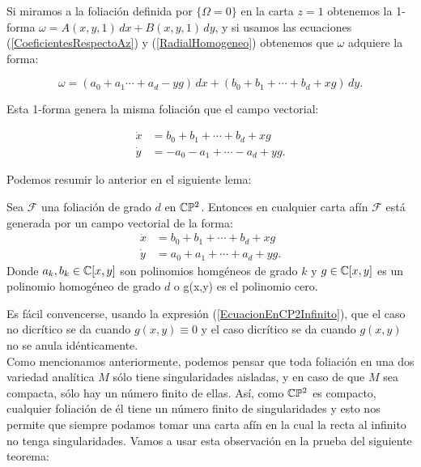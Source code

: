 Si miramos a la foliación definida por $\{ \Omega=0 \}$ en la carta $z=1$ obtenemos la 1-forma $\omega=A(x,y,1)\, dx+B(x,y,1)\, dy$, y si usamos las ecuaciones (\ref{CoeficientesRespectoAz}) y (\ref{RadialHomogeneo}) obtenemos que $\omega$ adquiere la forma:

\begin{equation}
\omega=(a_{0}+a_{1}\cdots+a_{d}-yg)\, dx+(b_{0}+b_{1}+\cdots+b_{d}+xg)\, dy.
\end{equation} 

\noindent Esta 1-forma genera la misma foliación que el campo vectorial:

\begin{equation}
\begin{aligned}
\dot{x} &= b_{0}+b_{1}+\cdots+b_{d}+xg\\
\dot{y} &= -a_{0}-a_{1}+\cdots-a_{d}+yg.
\end{aligned}
\end{equation}

Podemos resumir lo anterior en el siguiente lema:

\begin{Lema}
Sea $\mathcal{F}$ una foliación de grado $d$ en $\mathbb{C}\mathbb{P}^{2}$. Entonces en cualquier carta afín $\mathcal{F}$ está generada por un campo vectorial de la forma:
\begin{equation}
\begin{aligned}
\dot{x} &= b_{0}+b_{1}+\cdots+b_{d}+xg\\
\dot{y} &= a_{0}+a_{1}+\cdots+a_{d}+yg.
\end{aligned}
\end{equation}
Donde $a_{k},b_{k}\in\mathbb{C}[x,y]$ son polinomios homgéneos de grado $k$ y $g\in\mathbb{C}[x,y]$ es un polinomio homogéneo de grado $d$ o g(x,y) es el polinomio cero.
\end{Lema}

Es fácil convencerse, usando la expresión (\ref{EcuacionEnCP2Infinito}), que el caso no dicrítico se da cuando $g(x,y)\equiv 0$ y el caso dicrítico se da cuando $g(x,y)$ no se anula idénticamente.\\

Como mencionamos anteriormente, podemos pensar que toda foliación en una dos variedad analítica $M$ sólo tiene singularidades aisladas, y en caso de que $M$ sea compacta, sólo hay un número finito de ellas. Así, como $\mathbb{C}\mathbb{P}^{2}$ es compacto, cualquier foliación de él tiene un número finito de singularidades y esto nos permite que siempre podamos tomar una carta afín en la cual la recta al infinito no tenga singularidades. Vamos a usar esta observación en la prueba del siguiente teorema:

